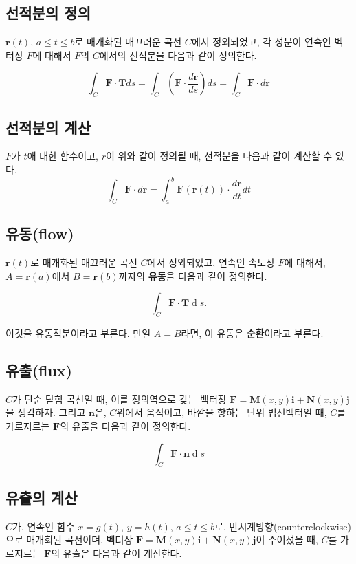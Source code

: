 \documentclass[chapter, oneside]{oblivoir}
\newcommand{\dx}[1]{\operatorname{d}\! #1}
\newcommand{\term}[1]{\textbf{#1}}
\begin{document}
\subsection{선적분의 정의 }

$\textbf{r}(t)$, $a \le t \le b$로 매개화된 매끄러운 곡선 $C$에서 정외되었고, 각 성분이 연속인 벡터장 $F$에 대해서 $F$의  $C$에서의 선적분을 다음과 같이 정의한다.

$$ \int_{C} \textbf{F} \cdot \textbf{T} ds = \int_{C} \left( \textbf{F} \cdot \frac{d \textbf{r}}{ds} \right) ds = \int_{C} \textbf{F} \cdot d\textbf{r}$$


\subsection{선적분의 계산}
$F$가 $t$애 대한 함수이고, $r$이 위와 같이 정의될 때, 선적분을 다음과 같이 계산할 수 있다.
$$ \int_{C} \textbf{F} \cdot d\textbf{r} = \int_a^b \textbf{F}(\textbf{r}(t)) \cdot \frac{d\textbf{r}}{dt} dt $$


\subsection{유동(flow)}
$\textbf{r}(t)$로 매개화된 매끄러운 곡선 $C$에서 정외되었고, 연속인 속도장 $F$에 대해서, $A=\textbf{r}(a)$에서 $B=\textbf{r}(b)$까자의 \term{유동}을 다음과 같이 정의한다.

$$ \int _{C} \textbf{F} \cdot {\textbf{T}} \dx{s}.$$

이것을 유동적분이라고 부른다. 만일 $A=B$라면, 이 유동은 \term{순환}이라고 부른다. 


\subsection{유출(flux)}
$C$가 단순 닫힘 곡선일 때, 이를 정의역으로 갖는 벡터장 $\textbf{F}  = \textbf{M}(x,y)\textbf{i} + \textbf{N}(x,y)\textbf{j}$을 생각하자. 그리고 $\textbf{n}$은, $C$위에서 움직이고, 바깥을 향하는 단위 법선벡터일 때, $C$를 가로지르는 $\textbf{F}$의 유출을 다음과 같이 정의한다.

$$ \int _{C} \textbf{F} \cdot {\textbf{n}} \dx{s}$$



\subsection{유출의 계산}
$C$가, 연속인 함수 $x=g(t)$, $y=h(t)$, $a \le t \le b$로, 반시계방향(counterclockwise)으로 매개회된 곡선이며, 
벡터장 $\textbf{F}  = \textbf{M}(x,y)\textbf{i} + \textbf{N}(x,y)\textbf{j}$이 주어졌을 때,
$C$를 가로지르는 $\textbf{F} $의 유출은 다음과 같이 계산한다.
\end{document}
